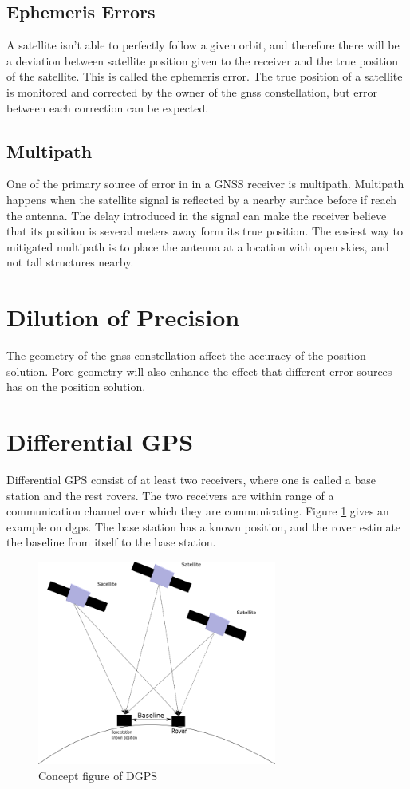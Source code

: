 \subsection{Ephemeris Errors}
A satellite isn't able to perfectly follow a given orbit, and therefore there will be a deviation between satellite position given to the receiver and the true position of the satellite. This is called the ephemeris error. The true position of a satellite is monitored and corrected by the owner of the \gls{gnss} constellation, but error between each correction can be expected.
\subsection{Multipath}
One of the primary source of error in in a GNSS receiver is multipath. Multipath happens when the satellite signal is reflected by a nearby surface before if reach the antenna. The delay introduced in the signal can make the receiver believe that its position is several meters away form its true position. The easiest way to mitigated multipath is to place the antenna at a location with open skies, and not tall structures nearby.
\section{Dilution of Precision}
The geometry of the \gls{gnss} constellation affect the accuracy of the position solution. Pore geometry will also enhance the effect that different error sources has on the position solution.
\section{Differential GPS}
Differential GPS consist of at least two receivers, where one is called a base station and the rest rovers. The two receivers are within range of a communication channel over which they are communicating. Figure \ref{figure:DGPS} gives an example on \gls{dgps}. The base station has a known position, and the rover estimate the baseline from itself to the base station. 
\begin{figure}[H]
	\centering
		\includegraphics[width=0.7\textwidth]{figs/DGPS.png}
		\caption{Concept figure of DGPS}
		\label{figure:DGPS}
\end{figure}
